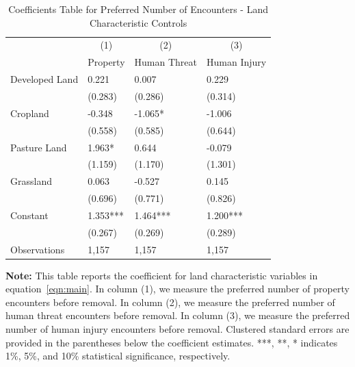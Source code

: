 \documentclass[english,12pt]{article}
\begin{document}
\begin{table}[H]
    \centering
    \caption{Coefficients Table for Preferred Number of Encounters - Land Characteristic Controls}
    \footnotesize
    \begin{tabular}{@{}llll@{}}
        \toprule
                           &\multicolumn{1}{c}{(1)}   &\multicolumn{1}{c}{(2)}   &\multicolumn{1}{c}{(3)}  \\
                           & Property & Human Threat & Human Injury \\ \midrule
        Developed Land&       0.221   &       0.007   &       0.229   \\
                    &     (0.283)   &     (0.286)   &     (0.314)   \\
        Cropland    &      -0.348   &      -1.065*  &      -1.006   \\
                    &     (0.558)   &     (0.585)   &     (0.644)   \\
        Pasture Land&       1.963*  &       0.644   &      -0.079   \\
                    &     (1.159)   &     (1.170)   &     (1.301)   \\
        Grassland   &       0.063   &      -0.527   &       0.145   \\
                    &     (0.696)   &     (0.771)   &     (0.826)   \\\midrule                       
        Constant    &       1.353***&       1.464***&       1.200***\\
            &     (0.267)   &     (0.269)   &     (0.289)   \\
        Observations & 1,157    &  1,157       & 1,157        \\\bottomrule
    \end{tabular}
    \begin{minipage}{.9\textwidth}
        \vspace{1em}
    \footnotesize{{\bf{Note:}} This table reports the coefficient for land characteristic variables in equation~\ref{eqn:main}. In column (1), we measure the preferred number of property encounters before removal. In column (2), we measure the preferred number of human threat encounters before removal. In column (3), we measure the preferred number of human injury encounters before removal. Clustered standard errors are provided in the parentheses below the coefficient estimates. ***, **, * indicates 1\%, 5\%, and 10\% statistical significance, respectively.}
    \label{tab: des_land}
    \end{minipage}
\end{table}
\end{document}
